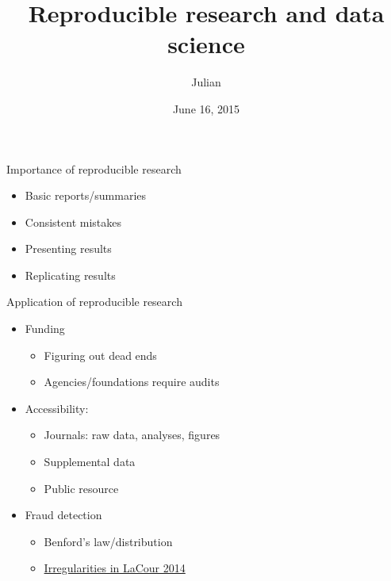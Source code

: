 \documentclass[ignorenonframetext,]{beamer}
\title{Reproducible research and data science}
\author{Julian}
\date{June 16, 2015}
\begin{document}
\frame{\titlepage}

\begin{frame}{Importance of reproducible research}

\begin{itemize}
\itemsep1pt\parskip0pt
\item
  Basic reports/summaries
\item
  Consistent mistakes
\item
  Presenting results
\item
  Replicating results
\end{itemize}

\end{frame}

\begin{frame}{Application of reproducible research}

\begin{itemize}
\itemsep1pt\parskip0pt
\item
  Funding

  \begin{itemize}
  \itemsep1pt\parskip0pt
  \item
    Figuring out dead ends\\
  \item
    Agencies/foundations require audits\\
  \end{itemize}
\item
  Accessibility:

  \begin{itemize}
  \itemsep1pt\parskip0pt
  \item
    Journals: raw data, analyses, figures\\
  \item
    Supplemental data\\
  \item
    Public resource\\
  \end{itemize}
\item
  Fraud detection

  \begin{itemize}
  \itemsep1pt\parskip0pt
  \item
    Benford's law/distribution\\
  \item
    \href{http://stanford.edu/~dbroock/broockman_kalla_aronow_lg_irregularities.pdf}{Irregularities
    in LaCour 2014}
  \end{itemize}
\end{itemize}

\end{frame}
\end{document}
